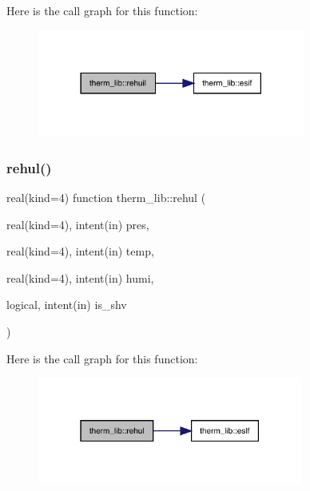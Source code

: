 Here is the call graph for this function\+:
\nopagebreak
\begin{figure}[H]
\begin{center}
\leavevmode
\includegraphics[width=249pt]{namespacetherm__lib_a41cd91c2aa39b6b956a791e3260e27e2_cgraph}
\end{center}
\end{figure}
\mbox{\label{namespacetherm__lib_a28012fb3e93800daaed6b23dc389937c}} 
\subsubsection{\texorpdfstring{rehul()}{rehul()}}
{\footnotesize\ttfamily real(kind=4) function therm\+\_\+lib\+::rehul (\begin{DoxyParamCaption}\item[{real(kind=4), intent(in)}]{pres,  }\item[{real(kind=4), intent(in)}]{temp,  }\item[{real(kind=4), intent(in)}]{humi,  }\item[{logical, intent(in)}]{is\+\_\+shv }\end{DoxyParamCaption})}

Here is the call graph for this function\+:
\nopagebreak
\begin{figure}[H]
\begin{center}
\leavevmode
\includegraphics[width=247pt]{namespacetherm__lib_a28012fb3e93800daaed6b23dc389937c_cgraph}
\end{center}
\end{figure}
\mbox{\label{namespacetherm__lib_a1fbd9c44eee7d212c59b884df5f03718}} 
